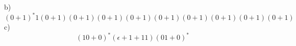 \begin{solution}
    b)
    $$(0+1)^*1(0+1)(0+1)(0+1)(0+1)(0+1)(0+1)(0+1)(0+1)(0+1)$$
    c)
    $$(10+0)^*(\epsilon+1+11)(01+0)^*$$
\end{solution}